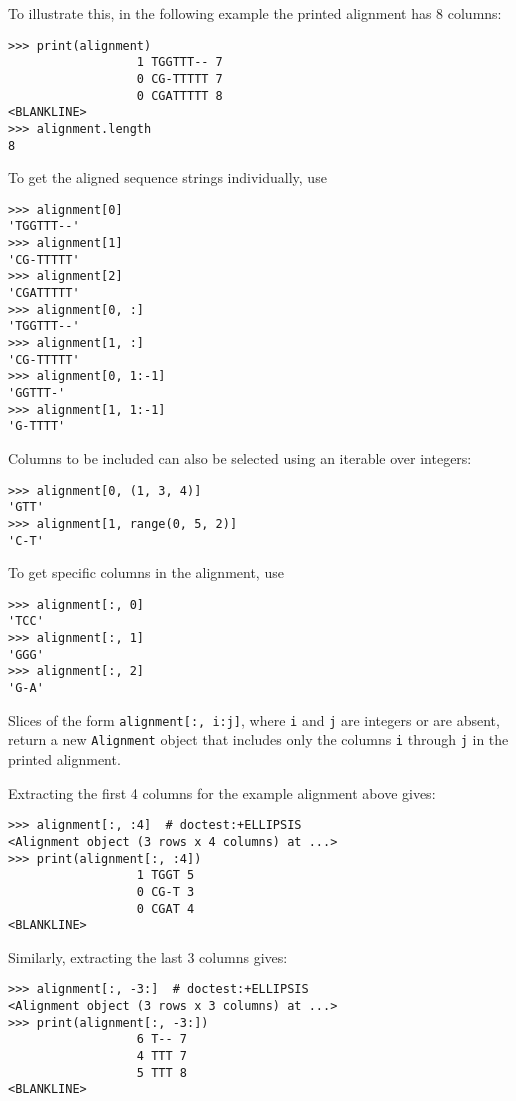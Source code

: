 To illustrate this, in the following example the printed alignment has 8 columns:

\begin{verbatim}
>>> print(alignment)
                  1 TGGTTT-- 7
                  0 CG-TTTTT 7
                  0 CGATTTTT 8
<BLANKLINE>
>>> alignment.length
8
\end{verbatim}

To get the aligned sequence strings individually, use
\begin{verbatim}
>>> alignment[0]
'TGGTTT--'
>>> alignment[1]
'CG-TTTTT'
>>> alignment[2]
'CGATTTTT'
>>> alignment[0, :]
'TGGTTT--'
>>> alignment[1, :]
'CG-TTTTT'
>>> alignment[0, 1:-1]
'GGTTT-'
>>> alignment[1, 1:-1]
'G-TTTT'
\end{verbatim}

Columns to be included can also be selected using an iterable over integers:
\begin{verbatim}
>>> alignment[0, (1, 3, 4)]
'GTT'
>>> alignment[1, range(0, 5, 2)]
'C-T'
\end{verbatim}

To get specific columns in the alignment, use
\begin{verbatim}
>>> alignment[:, 0]
'TCC'
>>> alignment[:, 1]
'GGG'
>>> alignment[:, 2]
'G-A'
\end{verbatim}

Slices of the form \verb+alignment[:, i:j]+, where \verb+i+ and \verb+j+ are integers or are absent, return a new \verb+Alignment+ object that includes only the columns \verb+i+ through \verb+j+ in the printed alignment.

Extracting the first 4 columns for the example alignment above gives:
\begin{verbatim}
>>> alignment[:, :4]  # doctest:+ELLIPSIS
<Alignment object (3 rows x 4 columns) at ...>
>>> print(alignment[:, :4])
                  1 TGGT 5
                  0 CG-T 3
                  0 CGAT 4
<BLANKLINE>
\end{verbatim}

Similarly, extracting the last 3 columns gives:
\begin{verbatim}
>>> alignment[:, -3:]  # doctest:+ELLIPSIS
<Alignment object (3 rows x 3 columns) at ...>
>>> print(alignment[:, -3:])
                  6 T-- 7
                  4 TTT 7
                  5 TTT 8
<BLANKLINE>
\end{verbatim}

